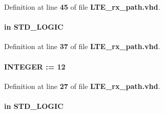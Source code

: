 Definition at line {\bf 45} of file {\bf L\+T\+E\+\_\+rx\+\_\+path.\+vhd}.

\paragraph[{D\+I\+Q2\+\_\+\+I\+Q\+S\+E\+L2}]{ {\bfseries \textcolor{keywordflow}{in}\textcolor{vhdlchar}{ }} {\bfseries \textcolor{comment}{S\+T\+D\+\_\+\+L\+O\+G\+IC}\textcolor{vhdlchar}{ }} \hspace{0.3cm}{\ttfamily [Port]}}\label{classLTE__rx__path_a717f13429e3fbdfb2a8a86727706aec7}


Definition at line {\bf 37} of file {\bf L\+T\+E\+\_\+rx\+\_\+path.\+vhd}.

\paragraph[{diq\+\_\+width}]{ {\bfseries \textcolor{vhdlchar}{ }} {\bfseries \textcolor{comment}{I\+N\+T\+E\+G\+ER}\textcolor{vhdlchar}{ }\textcolor{vhdlchar}{ }\textcolor{vhdlchar}{\+:}\textcolor{vhdlchar}{=}\textcolor{vhdlchar}{ }\textcolor{vhdlchar}{ } \textcolor{vhdldigit}{12} \textcolor{vhdlchar}{ }} \hspace{0.3cm}{\ttfamily [Generic]}}\label{classLTE__rx__path_a8f3619ae7c086284f10438374906f9a8}


Definition at line {\bf 27} of file {\bf L\+T\+E\+\_\+rx\+\_\+path.\+vhd}.

\paragraph[{en}]{ {\bfseries \textcolor{keywordflow}{in}\textcolor{vhdlchar}{ }} {\bfseries \textcolor{comment}{S\+T\+D\+\_\+\+L\+O\+G\+IC}\textcolor{vhdlchar}{ }} \hspace{0.3cm}{\ttfamily [Port]}}\label{classLTE__rx__path_a512588aa484615b7e90600a1bc9507b4}


